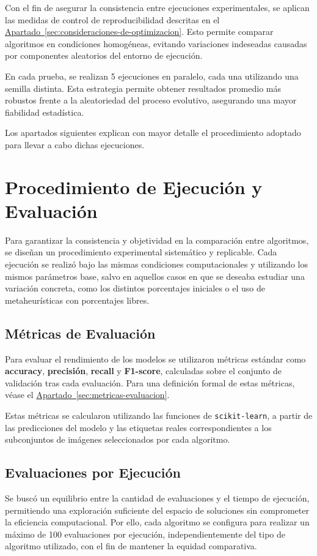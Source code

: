 Con el fin de asegurar la consistencia entre ejecuciones experimentales, se aplican las medidas de control de reproducibilidad
descritas en el \hyperref[sec:consideraciones-de-optimizacion]{Apartado~\ref*{sec:consideraciones-de-optimizacion}}.
Esto permite comparar algoritmos en condiciones homogéneas, evitando variaciones indeseadas causadas por componentes aleatorios del entorno de ejecución.

En cada prueba, se realizan 5 ejecuciones en paralelo, cada una utilizando una semilla distinta.
Esta estrategia permite obtener resultados promedio más robustos frente a la aleatoriedad del proceso evolutivo, asegurando una mayor fiabilidad estadística.

Los apartados siguientes explican con mayor detalle el procedimiento adoptado para llevar a cabo dichas ejecuciones.


\section{Procedimiento de Ejecución y Evaluación}\label{sec:procedimiento-de-ejecucion-y-evaluacion}
Para garantizar la consistencia y objetividad en la comparación entre algoritmos, se diseñan un procedimiento experimental sistemático y replicable.
Cada ejecución se realizó bajo las mismas condiciones computacionales y utilizando los mismos parámetros base,
salvo en aquellos casos en que se deseaba estudiar una variación concreta, como los distintos porcentajes iniciales o el uso de metaheurísticas con porcentajes libres.

\subsection{Métricas de Evaluación}\label{sec:metricas-de-evaluacion}
Para evaluar el rendimiento de los modelos se utilizaron métricas estándar como \textbf{accuracy}, \textbf{precisión}, \textbf{recall} y \textbf{F1-score},
calculadas sobre el conjunto de validación tras cada evaluación.
Para una definición formal de estas métricas, véase el \hyperref[sec:metricas-evaluacion]{Apartado~\ref*{sec:metricas-evaluacion}}.

Estas métricas se calcularon utilizando las funciones de \texttt{scikit-learn}, a partir de las predicciones del modelo y las etiquetas
reales correspondientes a los subconjuntos de imágenes seleccionados por cada algoritmo.

\subsection{Evaluaciones por Ejecución}\label{sec:evaluaciones-por-ejecucion}
Se buscó un equilibrio entre la cantidad de evaluaciones y el tiempo de ejecución, permitiendo una exploración suficiente del espacio de soluciones sin comprometer la eficiencia computacional.
Por ello, cada algoritmo se configura para realizar un máximo de 100 evaluaciones por ejecución,
independientemente del tipo de algoritmo utilizado, con el fin de mantener la equidad comparativa.

